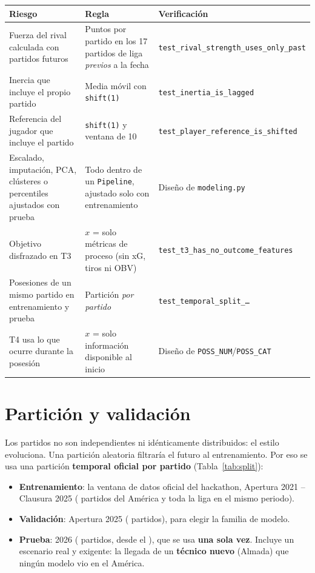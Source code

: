 \documentclass[11pt,a4paper]{article}
\begin{document}
\begin{center}
\small
\begin{tabular}{p{4.6cm} p{5.6cm} p{4.4cm}}
\toprule
\textbf{Riesgo} & \textbf{Regla} & \textbf{Verificación} \\
\midrule
Fuerza del rival calculada con partidos futuros & Puntos por partido en los 17 partidos de liga \emph{previos} a la fecha & \texttt{test\_rival\_strength\_uses\_only\_past} \\
Inercia que incluye el propio partido & Media móvil con \texttt{shift(1)} & \texttt{test\_inertia\_is\_lagged} \\
Referencia del jugador que incluye el partido & \texttt{shift(1)} y ventana de 10 & \texttt{test\_player\_reference\_is\_shifted} \\
Escalado, imputación, PCA, clústeres o percentiles ajustados con prueba & Todo dentro de un \texttt{Pipeline}, ajustado solo con entrenamiento & Diseño de \texttt{modeling.py} \\
Objetivo disfrazado en T3 & $x$ = solo métricas de proceso (sin xG, tiros ni OBV) & \texttt{test\_t3\_has\_no\_outcome\_features} \\
Posesiones de un mismo partido en entrenamiento y prueba & Partición \emph{por partido} & \texttt{test\_temporal\_split\_\dots} \\
T4 usa lo que ocurre durante la posesión & $x$ = solo información disponible al inicio & Diseño de \texttt{POSS\_NUM}/\texttt{POSS\_CAT} \\
\bottomrule
\end{tabular}
\end{center}

\section{Partición y validación}\label{sec:particion}
Los partidos no son independientes ni idénticamente distribuidos: el estilo evoluciona. Una partición aleatoria
filtraría el futuro al entrenamiento. Por eso se usa una partición \textbf{temporal oficial por partido}
(Tabla~\ref{tab:split}):
\begin{itemize}
  \item \textbf{Entrenamiento}: la ventana de datos oficial del hackathon, Apertura 2021 -- Clausura 2025 (\nTrain{}
        partidos del América y toda la liga en el mismo periodo).
  \item \textbf{Validación}: Apertura 2025 (\nVal{} partidos), para elegir la familia de modelo.
  \item \textbf{Prueba}: 2026 (\nTest{} partidos, desde el \testDesde), que se usa \textbf{una sola vez}. Incluye un
        escenario real y exigente: la llegada de un \textbf{técnico nuevo} (Almada) que ningún modelo vio en el América.
\end{itemize}
\end{document}
